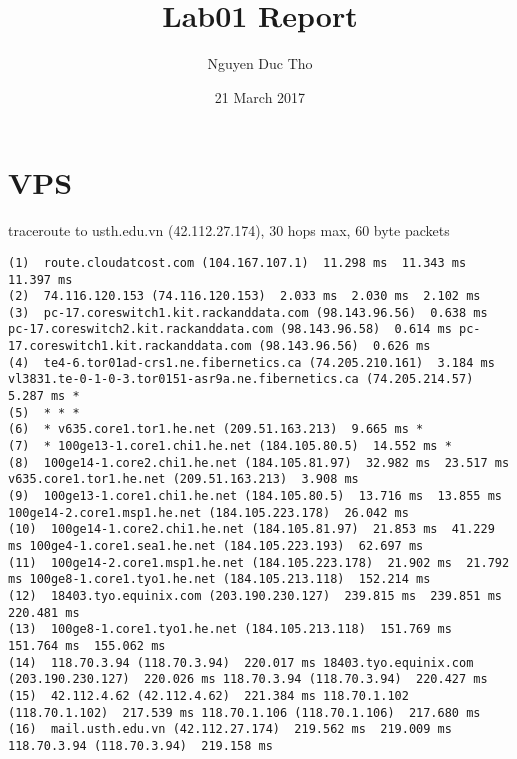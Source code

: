 \documentclass{article}
\title{Lab01 Report}
\author{Nguyen Duc Tho}
\date{21 March 2017}
\begin{document}
\maketitle



\section{VPS}
traceroute to usth.edu.vn (42.112.27.174), 30 hops max, 60 byte packets\linebreak

\begin{lstlisting}
(1)  route.cloudatcost.com (104.167.107.1)  11.298 ms  11.343 ms  11.397 ms
(2)  74.116.120.153 (74.116.120.153)  2.033 ms  2.030 ms  2.102 ms
(3)  pc-17.coreswitch1.kit.rackanddata.com (98.143.96.56)  0.638 ms pc-17.coreswitch2.kit.rackanddata.com (98.143.96.58)  0.614 ms pc-17.coreswitch1.kit.rackanddata.com (98.143.96.56)  0.626 ms
(4)  te4-6.tor01ad-crs1.ne.fibernetics.ca (74.205.210.161)  3.184 ms vl3831.te-0-1-0-3.tor0151-asr9a.ne.fibernetics.ca (74.205.214.57)  5.287 ms *
(5)  * * *
(6)  * v635.core1.tor1.he.net (209.51.163.213)  9.665 ms *
(7)  * 100ge13-1.core1.chi1.he.net (184.105.80.5)  14.552 ms *
(8)  100ge14-1.core2.chi1.he.net (184.105.81.97)  32.982 ms  23.517 ms v635.core1.tor1.he.net (209.51.163.213)  3.908 ms
(9)  100ge13-1.core1.chi1.he.net (184.105.80.5)  13.716 ms  13.855 ms 100ge14-2.core1.msp1.he.net (184.105.223.178)  26.042 ms
(10)  100ge14-1.core2.chi1.he.net (184.105.81.97)  21.853 ms  41.229 ms 100ge4-1.core1.sea1.he.net (184.105.223.193)  62.697 ms
(11)  100ge14-2.core1.msp1.he.net (184.105.223.178)  21.902 ms  21.792 ms 100ge8-1.core1.tyo1.he.net (184.105.213.118)  152.214 ms
(12)  18403.tyo.equinix.com (203.190.230.127)  239.815 ms  239.851 ms  220.481 ms
(13)  100ge8-1.core1.tyo1.he.net (184.105.213.118)  151.769 ms  151.764 ms  155.062 ms
(14)  118.70.3.94 (118.70.3.94)  220.017 ms 18403.tyo.equinix.com (203.190.230.127)  220.026 ms 118.70.3.94 (118.70.3.94)  220.427 ms
(15)  42.112.4.62 (42.112.4.62)  221.384 ms 118.70.1.102 (118.70.1.102)  217.539 ms 118.70.1.106 (118.70.1.106)  217.680 ms
(16)  mail.usth.edu.vn (42.112.27.174)  219.562 ms  219.009 ms 118.70.3.94 (118.70.3.94)  219.158 ms

\end{lstlisting}
\end{document}
